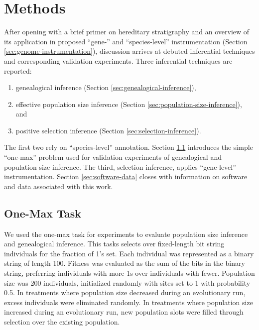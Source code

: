 \section{Methods} \label{sec:methods}

After opening with a brief primer on hereditary stratigraphy and an overview of its application in proposed ``gene-'' and ``species-level'' instrumentation (Section \ref{sec:genome-instrumentation}), discussion arrives at debuted inferential techniques and corresponding validation experiments.
Three inferential techniques are reported:
\begin{enumerate}
\item genealogical inference (Section \ref{sec:genealogical-inference}),
\item effective population size inference (Section \ref{sec:population-size-inference}), and
\item positive selection inference (Section \ref{sec:selection-inference}).
\end{enumerate}

The first two rely on ``species-level'' annotation.
Section \ref{sec:one-max} introduces the simple ``one-max'' problem used for validation experiments of genealogical and population size inference.
The third, selection inference, applies ``gene-level'' instrumentation.
Section \ref{sec:software-data} closes with information on software and data associated with this work.



\subsection{One-Max Task}
\label{sec:one-max}

We used the one-max task for experiments to evaluate population size inference and genealogical inference.
This tasks selects over fixed-length bit string individuals for the fraction of 1's set.
Each individual was represented as a binary string of length 100.
Fitness was evaluated as the sum of the bits in the binary string, preferring individuals with more 1s over individuals with fewer.
Population size was 200 individuals, initialized randomly with sites set to 1 with probability 0.5.
In treatments where population size decreased during an evolutionary run, excess individuals were eliminated randomly.
In treatments where population size increased during an evolutionary run,
new population slots were filled through selection over the existing population.

